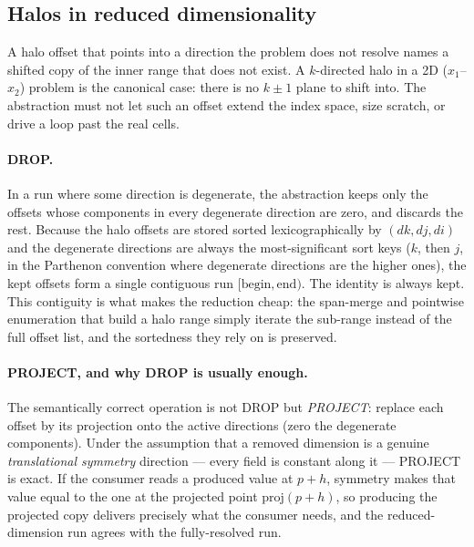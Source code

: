 \documentclass[11pt]{article}
\begin{document}
\subsection{Halos in reduced dimensionality}
\label{sec:reduced}

A halo offset that points into a direction the problem does not resolve names a
shifted copy of the inner range that does not exist. A $k$-directed halo in a 2D
($x_1$--$x_2$) problem is the canonical case: there is no $k\pm1$ plane to shift
into. The abstraction must not let such an offset extend the index space, size
scratch, or drive a loop past the real cells.

\paragraph{DROP.} In a run where some direction is degenerate, the abstraction
keeps only the offsets whose components in every degenerate direction are zero,
and discards the rest. Because the halo offsets are stored sorted
lexicographically by $(dk, dj, di)$ and the degenerate directions are always the
most-significant sort keys ($k$, then $j$, in the Parthenon convention where
degenerate directions are the higher ones), the kept offsets form a single
contiguous run $[\text{begin}, \text{end})$. The identity is always kept. This
contiguity is what makes the reduction cheap: the span-merge and pointwise
enumeration that build a halo range simply iterate the sub-range instead of the
full offset list, and the sortedness they rely on is preserved.

\paragraph{PROJECT, and why DROP is usually enough.} The semantically correct
operation is not DROP but \emph{PROJECT}: replace each offset by its projection
onto the active directions (zero the degenerate components). Under the assumption
that a removed dimension is a genuine \emph{translational symmetry} direction ---
every field is constant along it --- PROJECT is exact. If the consumer reads a
produced value at $p+h$, symmetry makes that value equal to the one at the
projected point $\text{proj}(p+h)$, so producing the projected copy delivers
precisely what the consumer needs, and the reduced-dimension run agrees with the
fully-resolved run.
\end{document}
